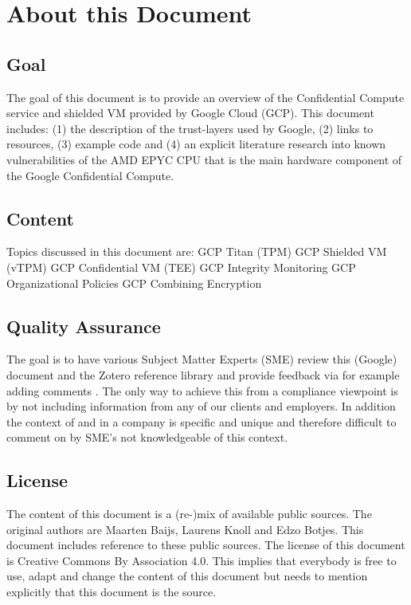 
\section*{About this Document}

 
\subsection*{Goal}
The goal of this document is to provide an overview of the Confidential Compute service and shielded VM provided by Google Cloud (GCP). This document includes: (1) the description of the trust-layers used by Google, (2) links to resources, (3) example code and (4) an explicit literature research into known vulnerabilities of the AMD EPYC CPU that is the main hardware component of the Google Confidential Compute. 

\subsection*{Content}
Topics discussed in this document are:
GCP Titan (TPM)
GCP Shielded VM (vTPM)
GCP Confidential VM (TEE)
GCP Integrity Monitoring
GCP Organizational Policies
GCP Combining Encryption

\subsection*{Quality Assurance}
The goal is to have various Subject Matter Experts (SME) review this (Google) document and the Zotero reference library and provide feedback via for example adding comments . 
The only way to achieve this from a compliance viewpoint is by not including information from any of our clients and employers. In addition the context of and in a company is specific and unique and therefore difficult to comment on by SME’s not knowledgeable of this context.

\subsection*{License}
The content of this document is a (re-)mix of available public sources. The original authors are Maarten Baijs, Laurens Knoll and Edzo Botjes. This document includes reference to these public sources. The license of this document is Creative Commons By Association 4.0. This implies that everybody is free to use, adapt and change the content of this document but needs to mention explicitly that this document is the source.

